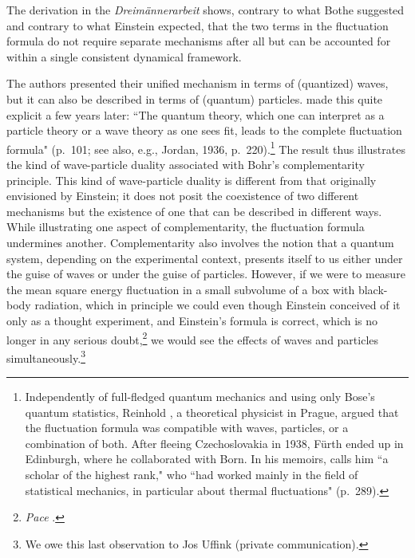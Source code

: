 \documentclass{elsart}
\begin{document}
The derivation in the {\it Dreim\"annerarbeit} shows, contrary to what Bothe suggested and contrary to what Einstein expected, that the two terms in the fluctuation formula do not require separate mechanisms after all but can be accounted for within a single consistent dynamical framework. 

The authors presented their unified mechanism in terms of (quantized) waves, but it can also be described in terms of (quantum) particles. \citet{Heisenberg 1930} made this quite explicit a few years later:  ``The quantum theory, which one can interpret as a particle theory or a wave theory as one sees fit, leads to the complete fluctuation formula" (p.\ 101; see also, e.g., Jordan, 1936, p.\ 220).\footnote{\label{fuerth}Independently of full-fledged quantum mechanics and using only Bose's quantum statistics, Reinhold \citet[p.\ 312]{Fuerth 1928}, a theoretical physicist in Prague, argued that the fluctuation formula was compatible with waves, particles, or a combination of both. After fleeing Czechoslovakia in 1938, F\"urth ended up in Edinburgh, where he collaborated with Born. In his memoirs, \citet{Born 1978} calls him ``a scholar of the highest rank," who ``had worked mainly in the field of statistical mechanics, in particular about thermal fluctuations" (p.\ 289).} The result thus illustrates the kind of wave-particle duality associated with Bohr's complementarity principle. This kind of wave-particle duality is different from that originally envisioned by Einstein; it does not posit the coexistence of two different mechanisms but the existence of one that can be described in different ways. While illustrating one aspect of complementarity, the fluctuation formula undermines another.  Complementarity also involves the notion that  a quantum system, depending on the experimental context,  presents itself to us either under the guise of waves or under the guise of particles. However, if we were to measure the mean square energy fluctuation in a small subvolume of a box with black-body radiation, which in principle we could even though Einstein conceived of it only as a thought experiment, and Einstein's formula is correct, which is no longer in any serious doubt,\footnote{{\it Pace} \citep{Gonzalez and Wergeland 1973}.} we would see the effects of waves and particles 
simultaneously.\footnote{We owe this last observation to Jos Uffink (private communication).}   
\end{document}
